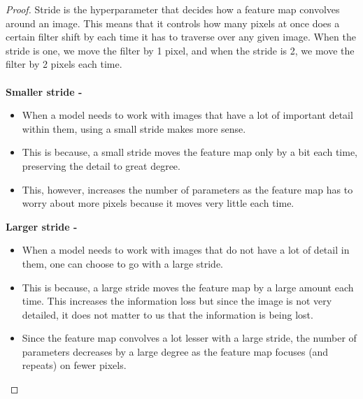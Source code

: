 \documentclass{article}
\theoremstyle{case}
\begin{document}
\begin{proof} 
Stride is the hyperparameter that decides how a feature map convolves around an image. This means that it controls how many pixels at once does a certain filter shift by each time it has to traverse over any given image. When the stride is one, we move the filter by 1 pixel, and when the stride is 2, we move the filter by 2 pixels each time. \\ \\
\textbf{Smaller stride - }
\begin{itemize}
    \item When a model needs to work with images that have a lot of important detail within them, using a small stride makes more sense.
    \item This is because, a small stride moves the feature map only by a bit each time, preserving the detail to great degree.
    \item This, however, increases the number of parameters as the feature map has to worry about more pixels because it moves very little each time. 
\end{itemize}

\textbf{Larger stride - }
\begin{itemize}
    \item When a model needs to work with images that do not have a lot of detail in them, one can choose to go with a large stride.
    \item This is because, a large stride moves the feature map by a large amount each time. This increases the information loss but since the image is not very detailed, it does not matter to us that the information is being lost.
    \item Since the feature map convolves a lot lesser with a large stride, the number of parameters decreases by a large degree as the feature map focuses (and repeats) on fewer pixels.  
\end{itemize}

\end{proof}
\end{document}
